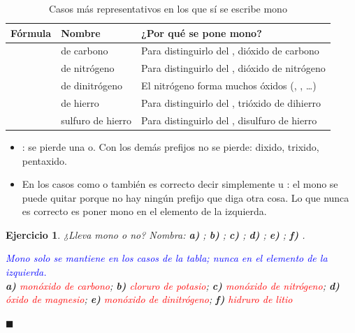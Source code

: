 \documentclass[12pt]{article}
\theoremstyle{mygreennumbox}
\newtheorem{ejercicioT}{Ejercicio}[section]
\newenvironment{exercise}{\begin{eBoxmygreen}\begin{ejercicioT}}{\hfill{\color{mygreen}\tiny\ensuremath{\blacksquare}}\end{ejercicioT}\end{eBoxmygreen}}
\begin{document}
\begin{table}[H]
    \centering
    \caption{Casos más representativos en los que sí se escribe mono}
    \vspace{-5pt}
    \begin{tabular}{@{}clL{6.5cm}@{}}
        \toprule
        \textbf{Fórmula} & \textbf{Nombre} & \textbf{¿Por qué se pone mono?} \\
        \midrule
         &  de carbono & Para distinguirlo del , dióxido de carbono \\[3pt]
         &  de nitrógeno & Para distinguirlo del , dióxido de nitrógeno \\[3pt]
         &  de dinitrógeno & El nitrógeno forma muchos óxidos (, , …) \\[3pt]
         &  de hierro & Para distinguirlo del , trióxido de dihierro \\[3pt]
         & sulfuro de hierro & Para distinguirlo del , disulfuro de hierro \\
        \bottomrule
    \end{tabular}
    \label{tab:mono}
\end{table}

\begin{marker}
    \begin{itemize}
        \item {}: se pierde una o. Con los demás prefijos no se pierde: dixido, trixido, pentaxido.
        \item En los casos como  o  también es correcto decir simplemente  u : el mono se puede quitar porque no hay ningún prefijo que diga otra cosa. Lo que nunca es correcto es poner mono en el elemento de la izquierda.
    \end{itemize}
\end{marker}

\begin{exercise}
    ¿Lleva mono o no? Nombra: \textbf{a)} ; \textbf{b)} ; \textbf{c)} ; \textbf{d)} ; \textbf{e)} ; \textbf{f)} .
    \begin{solu}
        \textcolor{blue}{Mono solo se mantiene en los casos de la tabla; nunca en el elemento de la izquierda.}\\
        \textbf{a)} \textcolor{red}{monóxido de carbono}; \textbf{b)} \textcolor{red}{cloruro de potasio}; \textbf{c)} \textcolor{red}{monóxido de nitrógeno}; \textbf{d)} \textcolor{red}{óxido de magnesio}; \textbf{e)} \textcolor{red}{monóxido de dinitrógeno}; \textbf{f)} \textcolor{red}{hidruro de litio}
    \end{solu}
\end{exercise}
\end{document}
